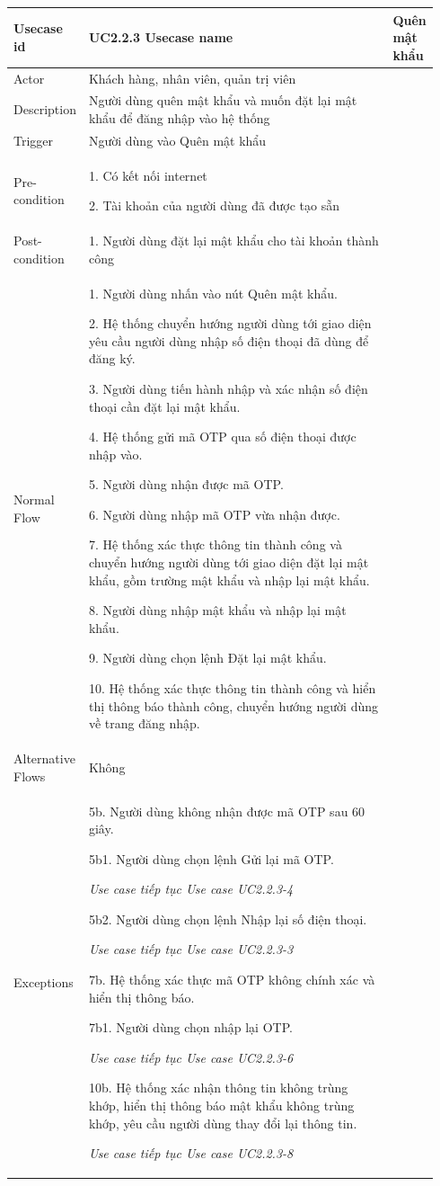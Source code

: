 

\begin{longtable}{|>{\hspace{0pt}}m{0.163\linewidth}|>{\hspace{0pt}}m{0.779\linewidth}|} 
\hline
Usecase id & UC2.2.3 \endfirsthead 
\hline
Usecase name & Quên mật khẩu \\ 
\hline
Actor & Khách hàng, nhân viên, quản trị viên \\ 
\hline
Description & Người dùng quên mật khẩu và muốn đặt lại mật khẩu để đăng nhập vào hệ thống \\ 
\hline
Trigger & Người dùng vào Quên mật khẩu~ \\ 
\hline
Pre-condition & 1. Có kết nối internet\par{}2. Tài khoản của người dùng đã được tạo sẵn \\ 
\hline
Post-condition & 1. Người dùng đặt lại mật khẩu cho tài khoản thành công \\ 
\hline
Normal Flow & 1. Người dùng nhấn vào nút Quên mật khẩu.\par{}2. Hệ thống chuyển hướng người dùng tới giao diện yêu cầu người dùng nhập số điện thoại đã dùng để đăng ký.\par{}3. Người dùng tiến hành nhập và xác nhận số điện thoại cần đặt lại mật khẩu.\par{}4. Hệ thống gửi mã OTP qua số điện thoại được nhập vào.~\par{}5. Người dùng nhận được mã OTP.\par{}6. Người dùng nhập mã OTP vừa nhận được.\par{}7. Hệ thống xác thực thông tin thành công và chuyển hướng người dùng tới giao diện đặt lại mật khẩu, gồm trường mật khẩu và nhập lại mật khẩu.\par{}8. Người dùng nhập mật khẩu và nhập lại mật khẩu.\par{}9. Người dùng chọn lệnh Đặt lại mật khẩu.\par{}10. Hệ thống xác thực thông tin thành công và hiển thị thông báo thành công, chuyển hướng người dùng về trang đăng nhập. \\ 
\hline
Alternative Flows & Không \\ 
\hline
Exceptions & 5b. Người dùng không nhận được mã OTP sau 60 giây.\par{}5b1. Người dùng chọn lệnh Gửi lại mã OTP.\par{}\textit{Use case tiếp tục Use case UC2.2.3-4}\par{}5b2. Người dùng chọn lệnh Nhập lại số điện thoại.\par{}\textit{Use case tiếp tục Use case UC2.2.3-3}\par{}7b. Hệ thống xác thực mã OTP không chính xác và hiển thị thông báo.\par{}7b1. Người dùng chọn nhập lại OTP.\par{}\textit{Use case tiếp tục Use case UC2.2.3-6}\par{}10b. Hệ thống xác nhận thông tin không trùng khớp, hiển thị thông báo mật khẩu không trùng khớp, yêu cầu người dùng thay đổi lại thông tin.\par{}\textit{Use case tiếp tục Use case UC2.2.3-8} \\ 

\end{longtable}
